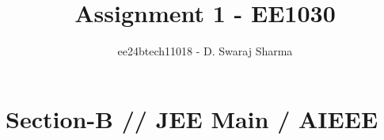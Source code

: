 \documentclass[journal,12pt,twocolumn]{IEEEtran}
\theoremstyle{remark}
\begin{document}

\vspace{3cm}

\title{Assignment 1 - EE1030}
\author{ee24btech11018 - D. Swaraj Sharma}
\maketitle
\newpage
\bigskip

\renewcommand{\thefigure}{\theenumi}
\renewcommand{\thetable}{\theenumi}

\section{\textbf{Section-B} // \textbf{JEE Main} / \textbf{AIEEE}}

\begin{enumerate}[label={\arabic*.}]



\end{enumerate}
\end{document}
